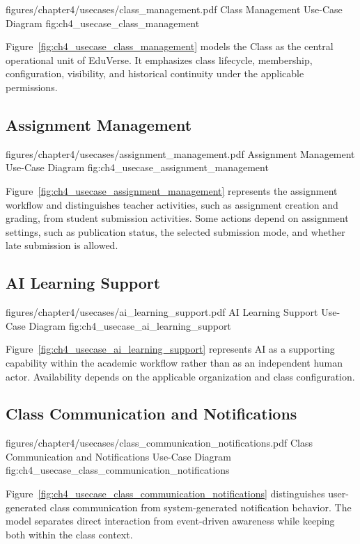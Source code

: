 \EduUseCasePdfFigure
  {figures/chapter4/usecases/class_management.pdf}
  {Class Management Use-Case Diagram}
  {fig:ch4_usecase_class_management}

Figure~\ref{fig:ch4_usecase_class_management} models the Class as the central
operational unit of EduVerse. It emphasizes class lifecycle, membership,
configuration, visibility, and historical continuity under the applicable
permissions.

\subsection*{Assignment Management}

\EduUseCasePdfFigure
  {figures/chapter4/usecases/assignment_management.pdf}
  {Assignment Management Use-Case Diagram}
  {fig:ch4_usecase_assignment_management}

Figure~\ref{fig:ch4_usecase_assignment_management} represents the assignment workflow and distinguishes teacher activities, such as assignment creation and grading, from student submission activities. Some actions depend on assignment settings, such as publication status, the selected submission mode, and whether late submission is allowed.

\subsection*{AI Learning Support}

\EduUseCasePdfFigure
  {figures/chapter4/usecases/ai_learning_support.pdf}
  {AI Learning Support Use-Case Diagram}
  {fig:ch4_usecase_ai_learning_support}

Figure~\ref{fig:ch4_usecase_ai_learning_support} represents AI as a supporting
capability within the academic workflow rather than as an independent human
actor. Availability depends on the applicable organization and class
configuration.

\subsection*{Class Communication and Notifications}

\EduUseCasePdfFigure
  {figures/chapter4/usecases/class_communication_notifications.pdf}
  {Class Communication and Notifications Use-Case Diagram}
  {fig:ch4_usecase_class_communication_notifications}

Figure~\ref{fig:ch4_usecase_class_communication_notifications} distinguishes
user-generated class communication from system-generated notification
behavior. The model separates direct interaction from event-driven awareness
while keeping both within the class context.

